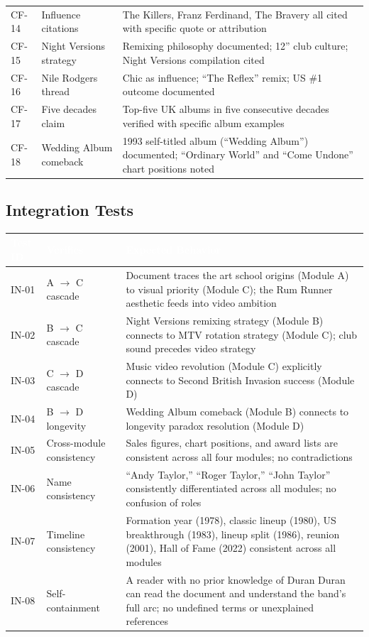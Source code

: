 \documentclass[11pt,letterpaper]{article}
\newcommand{\tableheader}[1]{\textbf{\sffamily\textcolor{white}{#1}}}
\begin{document}
\begin{center}
\begin{tabularx}{\textwidth}{C{1.5cm}L{4.5cm}X}
CF-14 & Influence citations & The Killers, Franz Ferdinand, The Bravery all cited with specific quote or attribution \\
CF-15 & Night Versions strategy & Remixing philosophy documented; 12'' club culture; Night Versions compilation cited \\
CF-16 & Nile Rodgers thread & Chic as influence; ``The Reflex'' remix; US \#1 outcome documented \\
CF-17 & Five decades claim & Top-five UK albums in five consecutive decades verified with specific album examples \\
CF-18 & Wedding Album comeback & 1993 self-titled album (``Wedding Album'') documented; ``Ordinary World'' and ``Come Undone'' chart positions noted \\
\bottomrule
\end{tabularx}
\end{center}

\subsection{Integration Tests}

\begin{center}
\begin{tabularx}{\textwidth}{C{1.5cm}L{4.5cm}X}
\toprule
{}
\tableheader{Test ID} & \tableheader{Verifies} & \tableheader{Expected Behavior} \\
\midrule
IN-01 & A $\rightarrow$ C cascade & Document traces the art school origins (Module A) to visual priority (Module C); the Rum Runner aesthetic feeds into video ambition \\
IN-02 & B $\rightarrow$ C cascade & Night Versions remixing strategy (Module B) connects to MTV rotation strategy (Module C); club sound precedes video strategy \\
IN-03 & C $\rightarrow$ D cascade & Music video revolution (Module C) explicitly connects to Second British Invasion success (Module D) \\
IN-04 & B $\rightarrow$ D longevity & Wedding Album comeback (Module B) connects to longevity paradox resolution (Module D) \\
IN-05 & Cross-module consistency & Sales figures, chart positions, and award lists are consistent across all four modules; no contradictions \\
IN-06 & Name consistency & ``Andy Taylor,'' ``Roger Taylor,'' ``John Taylor'' consistently differentiated across all modules; no confusion of roles \\
IN-07 & Timeline consistency & Formation year (1978), classic lineup (1980), US breakthrough (1983), lineup split (1986), reunion (2001), Hall of Fame (2022) consistent across all modules \\
IN-08 & Self-containment & A reader with no prior knowledge of Duran Duran can read the document and understand the band's full arc; no undefined terms or unexplained references \\
\bottomrule
\end{tabularx}
\end{center}
\end{document}
